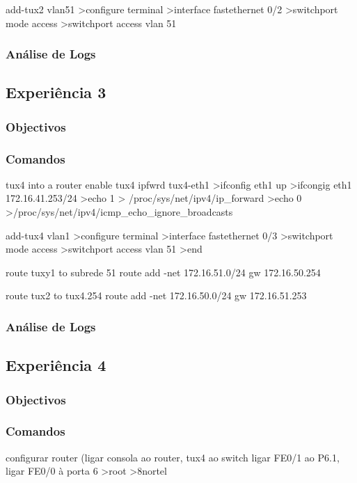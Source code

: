 \documentclass[a4paper,11pt]{article}
\begin{document}
add-tux2 vlan51
>configure terminal
>interface fastethernet 0/2
>switchport mode access
>switchport access vlan 51

\subsubsection{Análise de Logs}

\subsection{Experiência 3}
\subsubsection{Objectivos}

\subsubsection{Comandos}
tux4 into a router
enable tux4 ipfwrd
tux4-eth1
>ifconfig eth1 up
>ifcongig eth1 172.16.41.253/24
>echo 1 > /proc/sys/net/ipv4/ip_forward
>echo 0 >/proc/sys/net/ipv4/icmp_echo_ignore_broadcasts

add-tux4 vlan1
>configure terminal
>interface fastethernet 0/3
>switchport mode access
>switchport access vlan 51
>end

route tuxy1 to subrede 51
route add -net 172.16.51.0/24 gw 172.16.50.254

route tux2 to tux4.254
route add -net 172.16.50.0/24 gw 172.16.51.253

\subsubsection{Análise de Logs}

\subsection{Experiência 4}
\subsubsection{Objectivos}

\subsubsection{Comandos}
\lstlist
configurar router (ligar consola ao router, tux4 ao switch ligar FE0/1 ao P6.1, ligar FE0/0 à porta 6
>root
>8nortel
\end{document}
